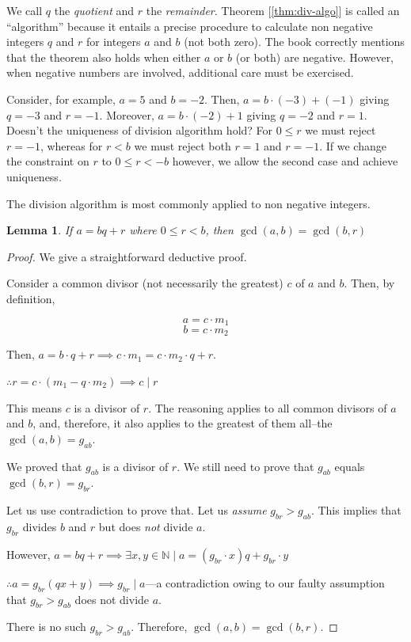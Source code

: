 \documentclass[english,notitlepage,smartquotes]{hgbreport}
\theoremstyle{definition}
\theoremstyle{remark}
\theoremstyle{plain}
\newtheorem{lemma}{Lemma}[chapter]
\begin{document}
We call $q$ the \emph{quotient} and $r$ the \emph{remainder}. Theorem [\ref{thm:div-algo}] is called an ``algorithm'' because it entails a precise procedure to calculate non negative integers $q$ and $r$ for integers $a$ and $b$ (not both zero). The book correctly mentions that the theorem also holds when either $a$ or $b$ (or both) are negative. However, when negative numbers are involved, additional care must be exercised.

Consider, for example, $a=5$ and $b=-2$. Then, $a=b\cdot (-3)+(-1)$ giving $q=-3$ and $r=-1$. Moreover, $a=b\cdot (-2)+1$ giving $q=-2$ and $r=1$. Doesn't the uniqueness of division algorithm hold? For $0\leq r$ we must reject $r=-1$, whereas for $r<b$ we must reject both $r=1$ and $r=-1$. If we change the constraint on $r$ to $0\leq r<-b$ however, we allow the second case and achieve uniqueness. 

The division algorithm is most commonly applied to non negative integers.
\begin{lemma}
\label{lemma:gcd-pre}
If $a=bq+r$ where $0\leq r<b$, then $\gcd(a,b)=\gcd(b,r)$
\end{lemma}
\begin{proof}
We give a straightforward deductive proof.

Consider a common divisor (not necessarily the greatest) $c$ of $a$ and $b$. Then, by definition,

$$
a=c\cdot m_1
$$
$$
b=c\cdot m_2
$$

Then, $a=b\cdot q+r\implies c\cdot m_1=c\cdot m_2\cdot q+r$.

$\therefore r=c\cdot(m_1-q\cdot m_2)\implies c\mid r$

This means $c$ is a divisor of $r$. The reasoning applies to all common divisors of $a$ and $b$, and, therefore, it also applies to the greatest of them all--the $\gcd(a,b)=g_{ab}$. 

We proved that $g_{ab}$ is a divisor of $r$. We still need to prove that $g_{ab}$ equals $\gcd(b,r)=g_{br}$. 

Let us use contradiction to prove that. Let us \emph{assume} $g_{br}>g_{ab}$. This implies that $g_{br}$ divides $b$ and $r$ but does \emph{not} divide $a$. 

However, $a=bq+r\implies \exists x,y\in\mathbb{N}\mid a=(g_{br}\cdot x)q+g_{br}\cdot y$

$\therefore a=g_{br}(qx+y)\implies g_{br}\mid a$---a contradiction owing to our faulty assumption that $g_{br}>g_{ab}$ does not divide $a$.

There is no such $g_{br}>g_{ab}$. Therefore, $\gcd(a,b)=\gcd(b,r)$.
\end{proof}
\end{document}
